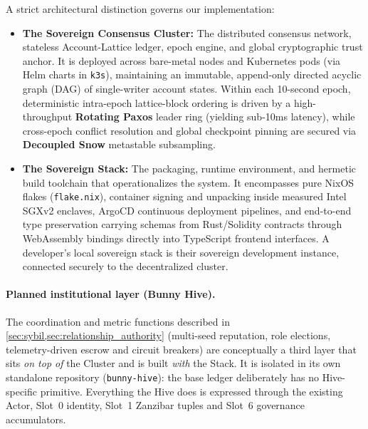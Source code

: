 \documentclass[a4paper,11pt,twoside,parskip=half-,headings=small]{scrartcl}
\newcommand{\code}[1]{\texttt{#1}}
\begin{document}
A strict architectural distinction governs our implementation:
\begin{itemize}
  \item \textbf{The Sovereign Consensus Cluster:} The distributed consensus network, stateless
Account-Lattice ledger, epoch engine, and global cryptographic trust anchor. It is
deployed across bare-metal nodes and Kubernetes pods (via Helm charts in \code{k3s}), maintaining
an immutable, append-only directed acyclic graph (DAG) of single-writer account states. Within each 10-second epoch, deterministic intra-epoch lattice-block ordering is driven by a high-throughput \textbf{Rotating Paxos} leader ring (yielding sub-10ms latency), while cross-epoch conflict resolution and global checkpoint pinning are secured via \textbf{Decoupled Snow} metastable subsampling.
  \item \textbf{The Sovereign Stack:} The packaging, runtime environment, and hermetic build
toolchain that operationalizes the system. It encompasses pure NixOS flakes (\code{flake.nix}), container
signing and unpacking inside measured Intel SGXv2 enclaves, ArgoCD continuous
deployment pipelines, and end-to-end type preservation carrying schemas from Rust/Solidity
contracts through WebAssembly bindings directly into TypeScript frontend interfaces.
A developer's local sovereign stack is their sovereign development instance, connected securely to the
decentralized cluster.
\end{itemize}

\paragraph{Planned institutional layer (Bunny Hive).}
The coordination and metric functions described in \cref{sec:sybil,sec:relationship_authority}
(multi-seed reputation, role elections, telemetry-driven escrow and circuit breakers) are
conceptually a third layer that sits \emph{on top of} the Cluster and is built \emph{with} the Stack.
It is isolated in its own standalone repository (\code{bunny-hive}): the base ledger deliberately has no
Hive-specific primitive. Everything the Hive does is expressed through the existing
Actor, Slot~0 identity, Slot~1 Zanzibar tuples and Slot~6 governance accumulators.
\end{document}
